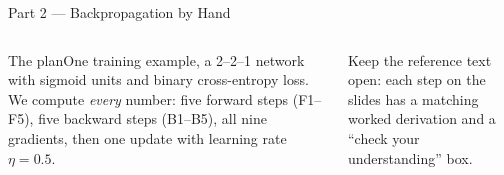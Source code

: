 \documentclass[aspectratio=169,10pt]{beamer}
\begin{document}
\begin{frame}{Part 2 --- Backpropagation by Hand}
\begin{columns}[T]
\begin{cbox}{The plan}\scriptsize One training example, a 2--2--1 network with sigmoid units and binary cross-entropy loss. We compute \emph{every} number: five forward steps (F1--F5), five backward steps (B1--B5), all nine gradients, then one update with learning rate $\eta=0.5$.\end{cbox}
\begin{ibox}\scriptsize Keep the reference text open: each step on the slides has a matching worked derivation and a ``check your understanding'' box.\end{ibox}
\end{columns}
\end{frame}
\end{document}

